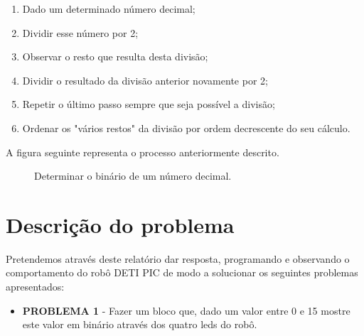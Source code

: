\documentclass[a4paper, 12pt, onecolumn, oneside]{report}
\begin{document}
\begin{enumerate}
\item Dado um determinado número decimal;
\item Dividir esse número por 2;
\item Observar o resto que resulta desta divisão;
\item Dividir o resultado da divisão anterior novamente por 2;
\item Repetir o último passo  sempre que seja possível a divisão;
\item Ordenar os "vários restos" da divisão por ordem decrescente do seu cálculo.

\end{enumerate}

A figura seguinte representa o processo anteriormente descrito.



\begin{figure}[H] 
\caption{Determinar o binário de um número decimal. }
\label{fig:speciation}
\end{figure}



\newpage
\section{Descrição do problema}

Pretendemos através deste relatório dar resposta, programando e observando o comportamento do robô DETI PIC de modo a solucionar os seguintes problemas apresentados: 

\begin{itemize}
  \item \textbf{PROBLEMA 1} - Fazer um bloco que, dado um valor entre 0 e 15 mostre este valor em binário através dos quatro leds do robô. 
 
  
  

\end{itemize}
\end{document}
